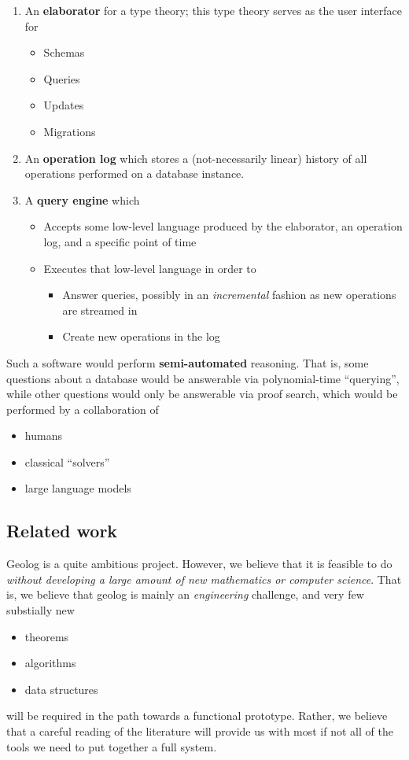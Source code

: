 \documentclass{article}
\begin{document}
\begin{enumerate}
\item An \textbf{elaborator} for a type theory; this type theory serves as the user interface for
\begin{itemize}
\item Schemas
\item Queries
\item Updates
\item Migrations
\end{itemize}
\item An \textbf{operation log} which stores a (not-necessarily linear) history of all operations performed on a database instance.
\item A \textbf{query engine} which
\begin{itemize}
\item Accepts some low-level language produced by the elaborator, an operation log, and a specific point of time
\item Executes that low-level language in order to
\begin{itemize}
\item Answer queries, possibly in an \emph{incremental} fashion as new operations are streamed in
\item Create new operations in the log
\end{itemize}
\end{itemize}
\end{enumerate}

Such a software would perform \textbf{semi-automated} reasoning. That is, some questions about a database would be answerable via polynomial-time ``querying'', while other questions would only be answerable via proof search, which would be performed by a collaboration of

\begin{itemize}
\item humans
\item classical ``solvers''
\item large language models
\end{itemize}
\subsection{Related work}
Geolog is a quite ambitious project. However, we believe that it is feasible to do \emph{without developing a large amount of new mathematics or computer science}. That is, we believe that geolog is mainly an \emph{engineering} challenge, and very few substially new
\begin{itemize}
\item theorems
\item algorithms
\item data structures
\end{itemize}
will be required in the path towards a functional prototype. Rather, we believe that a careful reading of the literature will provide us with most if not all of the tools we need to put together a full system.
\end{document}
